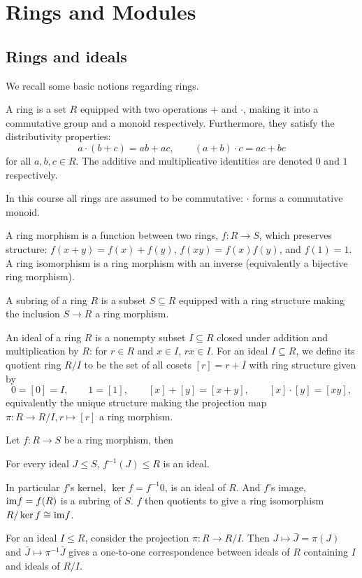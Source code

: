 \section{Rings and Modules}

\subsection{Rings and ideals}

We recall some basic notions regarding rings.

\bdefn

    A {\emphcolor ring} is a set $R$ equipped with two operations $+$ and $\cdot$, making it into a commutative group and a monoid respectively.
    Furthermore, they satisfy the distributivity properties:
    $$ a\cdot(b+c) = ab + ac,\qquad (a+b)\cdot c = ac + bc $$
    for all $a,b,c\in R$.
    The additive and multiplicative identities are denoted $0$ and $1$ respectively.

\edefn

\bnote

    In this course all rings are assumed to be {\emphcolor commutative}: $\cdot$ forms a commutative monoid.

\enote

\bdefn

    A {\emphcolor ring morphism} is a function between two rings, $f\colon R\to S$, which preserves structure: $f(x+y)=f(x)+f(y)$, $f(xy)=f(x)f(y)$,
    and $f(1)=1$.
    A {\emphcolor ring isomorphism} is a ring morphism with an inverse (equivalently a bijective ring morphism).

    A {\emphcolor subring} of a ring $R$ is a subset $S\subseteq R$ equipped with a ring structure making the inclusion $S\to R$ a ring morphism.

    An {\emphcolor ideal} of a ring $R$ is a nonempty subset $I\subseteq R$ closed under addition and multiplication by $R$: for $r\in R$ and $x\in I$,
    $rx\in I$.
    For an ideal $I\subseteq R$, we define its {\emphcolor quotient ring} $R/I$ to be the set of all cosets $[r]=r+I$ with ring structure given by
    $$ 0 = [0] = I,\qquad 1 = [1],\qquad [x] + [y] = [x+y],\qquad [x]\cdot[y] = [xy] , $$
    equivalently the unique structure making the projection map $\pi\colon R\to R/I,r\mapsto[r]$ a ring morphism.

\edefn

\bprop

    Let $f\colon R\to S$ be a ring morphism, then
    \benum
        \item For every ideal $J\leq S$, $f^{-1}(J)\leq R$ is an ideal.
        \item In particular $f$'s {\emphcolor kernel}, $\ker f=f^{-1}0$, is an ideal of $R$.
        And $f$'s {\emphcolor image}, ${\rm im} f=f(R)$ is a subring of $S$.
        $f$ then quotients to give a ring isomorphism $R/\mathop{\rm ker} f\cong{\rm im} f$.
        \item For an ideal $I\leq R$, consider the projection $\pi\colon R\to R/I$.
        Then $J\mapsto\bar J=\pi(J)$ and $\bar J\mapsto\pi^{-1}\bar J$ gives a one-to-one correspondence between ideals of $R$ containing $I$
        and ideals of $R/I$.
    \eenum

